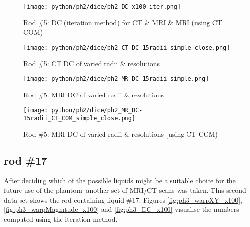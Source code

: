 \begin{figure}[!bp]
    \centering
    \texttt{[image: python/ph2/dice/ph2\_DC\_x100\_iter.png]}
    \caption{Rod \#5: DC (iteration method) for CT \& MRI \& MRI (using CT COM)}
    \label{fig:ph2_DC_x100}
\end{figure}

\begin{figure}[!bp]
  \centering
  \texttt{[image: python/ph2/dice/ph2\_CT\_DC-15radii\_simple\_close.png]}
  \caption{Rod \#5: CT DC of varied radii \& resolutions}
  \label{fig:ph2_CT_DC-15iter}
\end{figure}

\begin{figure}[!tbp]
  \centering
    \texttt{[image: python/ph2/dice/ph2\_MR\_DC-15radii\_simple.png]}
    \caption{Rod \#5: MRI DC of varied radii \& resolutions}
    \label{fig:ph2_MR_DC-15iter}
\end{figure}

\begin{figure}[!tbp]
      \centering
    \texttt{[image: python/ph2/dice/ph2\_MR\_DC-15radii\_CT\_COM\_simple\_close.png]}
    \caption{Rod \#5: MRI DC of varied radii \& resolutions (using CT-COM)}
    \label{fig:ph2_MR_CT-COM_DC-15iter}
\end{figure}

\clearpage



\subsection{rod \#17}

After deciding which of the possible liquids might be a suitable choice for the future use of the phantom, another set of MRI/CT scans was taken.
This second data set shows the rod containing liquid \#17.
Figures \ref{fig:ph3_warpXY_x100}, \ref{fig:ph3_warpMagnitude_x100} and \ref{fig:ph3_DC_x100} visualise the numbers computed using the iteration method.

